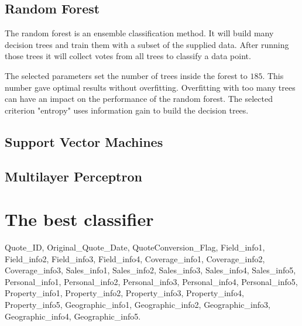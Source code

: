 \subsection{Random Forest}

The random forest is an ensemble classification method. It will build many decision trees and train them with a subset of the supplied data. After running those trees it will collect votes from all trees to classify a data point.

The selected parameters set the number of trees inside the forest to $185$. This number gave optimal results without overfitting. Overfitting with too many trees can have an impact on the performance of the random forest. The selected criterion "entropy" uses information gain to build the decision trees.



\subsection{Support Vector Machines}



\subsection{Multilayer Perceptron}




\section{The best classifier}






 Quote\_ID, Original\_Quote\_Date, QuoteConversion\_Flag, Field\_info1, Field\_info2, Field\_info3, Field\_info4, Coverage\_info1, Coverage\_info2, Coverage\_info3, Sales\_info1, Sales\_info2, Sales\_info3, Sales\_info4, Sales\_info5, Personal\_info1, Personal\_info2, Personal\_info3, Personal\_info4, Personal\_info5, Property\_info1, Property\_info2, Property\_info3, Property\_info4, Property\_info5, Geographic\_info1, Geographic\_info2, Geographic\_info3, Geographic\_info4, Geographic\_info5.
